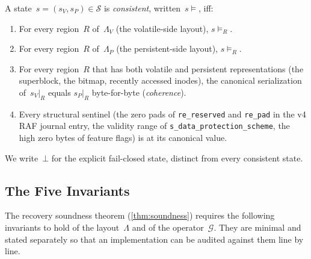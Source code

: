 \begin{definition}[Consistency]\label{def:consistent}
A state~\(s = (s_V, s_P) \in \mathcal{S}\) is \emph{consistent},
written~\(s \models\), iff:
\begin{enumerate}
\item For every region~\(R\) of~\(\Lambda_V\) (the volatile-side
  layout), \(s \models_R\).
\item For every region~\(R\) of~\(\Lambda_P\) (the persistent-side
  layout), \(s \models_R\).
\item For every region~\(R\) that has both volatile and persistent
  representations (the superblock, the bitmap, recently accessed
  inodes), the canonical serialization of~\(s_V|_R\) equals
  \(s_P|_R\) byte-for-byte (\emph{coherence}).
\item Every structural sentinel (the zero pads of \texttt{re\_reserved}
  and \texttt{re\_pad} in the v4 RAF journal entry, the validity
  range of \texttt{s\_data\_protection\_scheme}, the high zero
  bytes of feature flags) is at its canonical value.
\end{enumerate}
We write~\(\bot\) for the explicit fail-closed state, distinct from
every consistent state.
\end{definition}

\subsection{The Five Invariants}\label{sub:invariants}

The recovery soundness theorem (\cref{thm:soundness}) requires the
following invariants to hold of the layout~\(\Lambda\) and of the
operator~\(\mathcal{G}\). They are minimal and stated separately so
that an implementation can be audited against them line by line.

